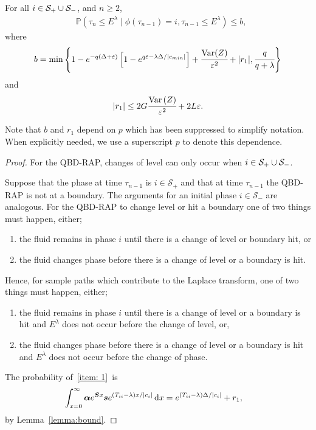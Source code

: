 \begin{lem}\label{lem: another bound}
	For all \(i\in\mathcal S_+\cup \mathcal{S}_-\), and \(n\geq 2\),
	\begin{align}
		&\mathbb P(\tau_n\leq E^\lambda \mid \phi(\tau_{n-1})=i, \tau_{n-1}\leq  E^\lambda ) \leq b,
	\end{align}
	where 
	\[b = \min\left\{1-e^{-q(\Delta+\varepsilon)}\left[1-e^{q\varepsilon-\lambda \Delta/|c_{min}|}\right] + \cfrac{\mathrm{Var}(Z)}{\varepsilon^2} + |r_1|,\cfrac{q}{q+\lambda}\right\}\]
	and  
	\[|r_1|\leq 2G\cfrac{\mathrm{Var} \left(Z\right)}{\varepsilon^2} + 2L\varepsilon.\]
\end{lem}
Note that \(b\) and \(r_1\) depend on \(p\) which has been suppressed to simplify notation. When explicitly needed, we use a superscript \(p\) to denote this dependence.  
\begin{proof}
	For the QBD-RAP, changes of level can only occur when \(i\in\mathcal S_+\cup\mathcal{S}_-\). 
	
	Suppose that the phase at time \(\tau_{n-1}\) is \(i\in\mathcal S_+\) and that at time \(\tau_{n-1}\) the QBD-RAP is not at a boundary. The arguments for an initial phase \(i\in\mathcal S_-\) are analogous. For the QBD-RAP to change level or hit a boundary one of two things must happen, either; 
	\begin{enumerate}
		\item the fluid remains in phase \(i\) until there is a change of level or boundary hit, or
		\item the fluid changes phase before there is a change of level or a boundary is hit. 
	\end{enumerate}
	
	Hence, for sample paths which contribute to the Laplace transform, one of two things must happen, either; 
	\begin{enumerate}
		\item the fluid remains in phase \(i\) until there is a change of level or a boundary is hit and \(E^\lambda\) does not occur before the change of level, or, \label{item: 1}
		\item the fluid changes phase before there is a change of level or a boundary is hit and \(E^\lambda\) does not occur before the change of phase. \label{item: 2}
	\end{enumerate}
	
	The probability of~\ref{item: 1}~is 
	\begin{align}
		\int_{x=0}^\infty \boldsymbol \alpha e^{\boldsymbol{S}x}\boldsymbol s e^{(T_{ii}-\lambda)x/|c_i|}\, \mathrm{d} x 
		&= e^{(T_{ii}-\lambda)\Delta/|c_i|} + r_1,\label{eqn: bnd this 12345}
	\end{align}
	by Lemma~\ref{lemma:bound}.
	

\end{proof}
